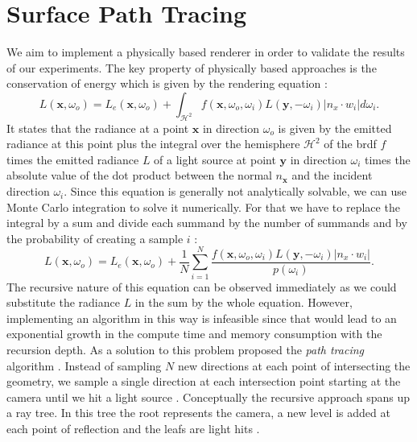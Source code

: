 \section{Surface Path Tracing}
We aim to implement a physically based renderer in order to validate the results of our experiments.
The key property of physically based approaches is the conservation of energy which is given by the rendering equation \cite{rendering_equation}:
\begin{equation}
    \label{eq:render_equation}
    L(\boldsymbol{x}, \omega_o) = L_e(\boldsymbol{x}, \omega_o) + \int_{\mathcal{H}^2} f(\boldsymbol{x}, \omega_o, \omega_i) L(\boldsymbol{y}, -\omega_i) |n_x \cdot w_i| d\omega_i.
\end{equation}
It states that the radiance at a point $\boldsymbol{x}$ in direction $\omega_o$ is given by the emitted radiance at this point plus the integral over the hemisphere $\mathcal{H}^2$ of the \ac{brdf} $f$ times the emitted radiance $L$ of a light source at point $\boldsymbol{y}$ in direction $\omega_i$ times the absolute value of the dot product between the normal $n_\textbf{x}$ and the incident direction $\omega_i$.
Since this equation is generally not analytically solvable, we can use Monte Carlo integration to solve it numerically.
For that we have to replace the integral by a sum and divide each summand by the number of summands and by the probability of creating a sample $i$ \cite{pbr}:
\begin{equation*}
    L(\boldsymbol{x}, \omega_o) = L_e(\boldsymbol{x}, \omega_o) + \frac{1}{N}\sum_{i=1}^{N} \frac{f(\boldsymbol{x}, \omega_o, \omega_i) L(\boldsymbol{y}, -\omega_i) |n_x \cdot w_i|}{p(\omega_i)}.
\end{equation*}
The recursive nature of this equation can be observed immediately as we could substitute the radiance $L$ in the sum by the whole equation.
However, implementing an algorithm in this way is infeasible since that would lead to an exponential growth in the compute time and memory consumption with the recursion depth.
As a solution to this problem \citeauthor{rendering_equation} proposed the \textit{path tracing} algorithm \cite{rendering_equation}.
Instead of sampling $N$ new directions at each point of intersecting the geometry, we sample a single direction at each intersection point starting at the camera until we hit a light source \cite{rendering_equation}.
Conceptually the recursive approach spans up a ray tree.
In this tree the root represents the camera, a new level is added at each point of reflection and the leafs are light hits \cite{rendering_equation}.

